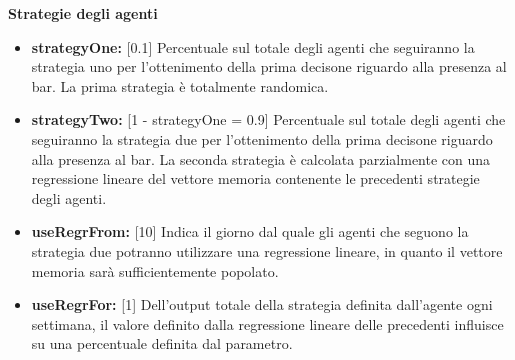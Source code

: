 \documentclass{article}
\begin{document}
{    \textbf{Strategie degli agenti}
    \begin{itemize}
        \item \textbf{strategyOne:} [0.1] Percentuale sul totale degli agenti che seguiranno la strategia uno per l'ottenimento della prima decisone riguardo alla presenza al bar. La prima strategia è totalmente randomica.
        \item \textbf{strategyTwo: } [1 - strategyOne = 0.9] Percentuale sul totale degli agenti che seguiranno la strategia due per l'ottenimento della prima decisone riguardo alla presenza al bar. La seconda strategia è calcolata parzialmente con una regressione lineare del vettore memoria contenente le precedenti strategie degli agenti.
        \item \textbf{useRegrFrom: } [10] Indica il giorno dal quale gli agenti che seguono la strategia due potranno utilizzare una regressione lineare, in quanto il vettore memoria sarà sufficientemente popolato.
        \item \textbf{useRegrFor: } [1] Dell'output totale della strategia definita dall'agente ogni settimana, il valore definito dalla regressione lineare delle precedenti influisce su una percentuale definita dal parametro.\newline
    \end{itemize}

}
\end{document}
